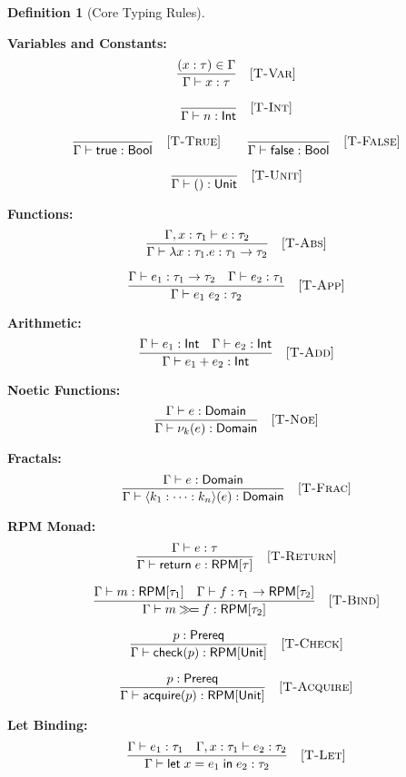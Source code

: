 \documentclass[11pt,twoside,openright]{book}
\theoremstyle{definition}
\newtheorem{definition}{Definition}[chapter]
\theoremstyle{plain}
\theoremstyle{remark}
\newcommand{\noe}[1]{\nu_{#1}}
\newcommand{\rpmret}{\mathsf{return}}
\newcommand{\rpmbind}{\mathbin{\gg\!=}}
\begin{document}
\begin{definition}[Core Typing Rules]
\label{def:typing-rules}

\textbf{Variables and Constants:}
\[
\frac{(x : \tau) \in \Gamma}{\Gamma \vdash x : \tau} \quad [\textsc{T-Var}]
\]

\[
\frac{}{\Gamma \vdash n : \mathsf{Int}} \quad [\textsc{T-Int}]
\]

\[
\frac{}{\Gamma \vdash \mathsf{true} : \mathsf{Bool}} \quad [\textsc{T-True}]
\qquad
\frac{}{\Gamma \vdash \mathsf{false} : \mathsf{Bool}} \quad [\textsc{T-False}]
\]

\[
\frac{}{\Gamma \vdash () : \mathsf{Unit}} \quad [\textsc{T-Unit}]
\]

\textbf{Functions:}
\[
\frac{\Gamma, x : \tau_1 \vdash e : \tau_2}{\Gamma \vdash \lambda x : \tau_1. e : \tau_1 \to \tau_2} \quad [\textsc{T-Abs}]
\]

\[
\frac{\Gamma \vdash e_1 : \tau_1 \to \tau_2 \quad \Gamma \vdash e_2 : \tau_1}{\Gamma \vdash e_1\; e_2 : \tau_2} \quad [\textsc{T-App}]
\]

\textbf{Arithmetic:}
\[
\frac{\Gamma \vdash e_1 : \mathsf{Int} \quad \Gamma \vdash e_2 : \mathsf{Int}}{\Gamma \vdash e_1 + e_2 : \mathsf{Int}} \quad [\textsc{T-Add}]
\]

\textbf{Noetic Functions:}
\[
\frac{\Gamma \vdash e : \mathsf{Domain}}{\Gamma \vdash \noe{k}(e) : \mathsf{Domain}} \quad [\textsc{T-Noe}]
\]

\textbf{Fractals:}
\[
\frac{\Gamma \vdash e : \mathsf{Domain}}{\Gamma \vdash \langle k_1 : \cdots : k_n \rangle(e) : \mathsf{Domain}} \quad [\textsc{T-Frac}]
\]

\textbf{RPM Monad:}
\[
\frac{\Gamma \vdash e : \tau}{\Gamma \vdash \rpmret\; e : \mathsf{RPM}[\tau]} \quad [\textsc{T-Return}]
\]

\[
\frac{\Gamma \vdash m : \mathsf{RPM}[\tau_1] \quad \Gamma \vdash f : \tau_1 \to \mathsf{RPM}[\tau_2]}{\Gamma \vdash m \rpmbind f : \mathsf{RPM}[\tau_2]} \quad [\textsc{T-Bind}]
\]

\[
\frac{p : \mathsf{Prereq}}{\Gamma \vdash \mathsf{check}(p) : \mathsf{RPM}[\mathsf{Unit}]} \quad [\textsc{T-Check}]
\]

\[
\frac{p : \mathsf{Prereq}}{\Gamma \vdash \mathsf{acquire}(p) : \mathsf{RPM}[\mathsf{Unit}]} \quad [\textsc{T-Acquire}]
\]

\textbf{Let Binding:}
\[
\frac{\Gamma \vdash e_1 : \tau_1 \quad \Gamma, x : \tau_1 \vdash e_2 : \tau_2}{\Gamma \vdash \mathsf{let}\; x = e_1 \;\mathsf{in}\; e_2 : \tau_2} \quad [\textsc{T-Let}]
\]


\end{definition}
\end{document}

